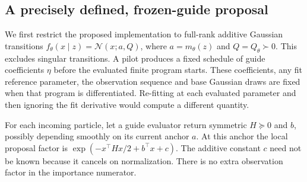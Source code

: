 \subsection{A precisely defined, frozen-guide proposal}

We first restrict the proposed implementation to full-rank additive Gaussian
transitions $f_\theta(x\mid z)=\mathcal N(x;a,Q)$, where
$a=m_\theta(z)$ and $Q=Q_\theta\succ0$. This excludes singular transitions.
A pilot produces a fixed schedule of guide coefficients $\eta$ before the
evaluated finite program starts. These coefficients, any fit reference
parameter, the observation sequence and base Gaussian draws are fixed when
that program is differentiated. Re-fitting at each evaluated parameter and
then ignoring the fit derivative would compute a different quantity.

For each incoming particle, let a guide evaluator return symmetric
$H\succeq0$ and $b$, possibly depending smoothly on its current anchor $a$.
At this anchor the local proposal factor is
$\exp(-x^\top Hx/2+b^\top x+c)$. The additive constant $c$ need not be
known because it cancels on normalization. There is no extra observation
factor in the importance numerator.

